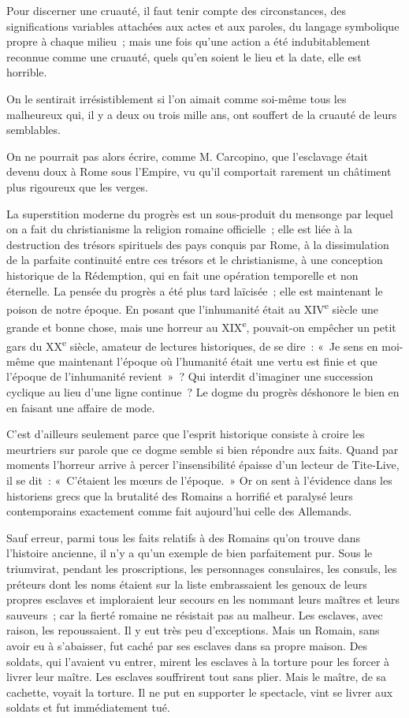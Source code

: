 \documentclass[french,twoside]{book} %
\begin{document}
Pour discerner une cruauté, il faut tenir compte des circonstances, des significations variables attachées aux actes et aux paroles, du langage symbolique propre à chaque milieu ; mais une fois qu'une action a été indubitablement reconnue comme une cruauté, quels qu'en soient le lieu et la date, elle est horrible.\par
On le sentirait irrésistiblement si l'on aimait comme soi-même tous les malheureux qui, il y a deux ou trois mille ans, ont souffert de la cruauté de leurs semblables.\par
On ne pourrait pas alors écrire, comme M. Carcopino, que l'esclavage était devenu doux à Rome sous l'Empire, vu qu'il comportait rarement un châtiment plus rigoureux que les verges.\par
La superstition moderne du progrès est un sous-produit du mensonge par lequel on a fait du christianisme la religion romaine officielle ; elle est liée à la destruction des trésors spirituels des pays conquis par Rome, à la dissimulation de la parfaite continuité entre ces trésors et le christianisme, à une conception historique de la Rédemption, qui en fait une opération temporelle et non éternelle. La pensée du progrès a été plus tard laïcisée ; elle est maintenant le poison de notre époque. En posant que l'inhumanité était au XIV\textsuperscript{e} siècle une grande et bonne chose, mais une horreur au XIX\textsuperscript{e}, pouvait-on empêcher un petit gars du XX\textsuperscript{e} siècle, amateur de lectures historiques, de se dire : « Je sens en moi-même que maintenant l'époque où l'humanité était une vertu est finie et que l'époque de l'inhumanité revient » ? Qui interdit d'imaginer une succession cyclique au lieu d'une ligne continue ? Le dogme du progrès déshonore le bien en en faisant une affaire de mode.\par
C'est d'ailleurs seulement parce que l'esprit historique consiste à croire les meurtriers sur parole que ce dogme semble si bien répondre aux faits. Quand par moments l'horreur arrive à percer l'insensibilité épaisse d'un lecteur de Tite-Live, il se dit : « C'étaient les mœurs de l'époque. » Or on sent à l'évidence dans les historiens grecs que la brutalité des Romains a horrifié et paralysé leurs contemporains exactement comme fait aujourd'hui celle des Allemands.\par
Sauf erreur, parmi tous les faits relatifs à des Romains qu'on trouve dans l'histoire ancienne, il n'y a qu'un exemple de bien parfaitement pur. Sous le triumvirat, pendant les proscriptions, les personnages consulaires, les consuls, les préteurs dont les noms étaient sur la liste embrassaient les genoux de leurs propres esclaves et imploraient leur secours en les nommant leurs maîtres et leurs sauveurs ; car la fierté romaine ne résistait pas au malheur. Les esclaves, avec raison, les repoussaient. Il y eut très peu d'exceptions. Mais un Romain, sans avoir eu à s'abaisser, fut caché par ses esclaves dans sa propre maison. Des soldats, qui l'avaient vu entrer, mirent les esclaves à la torture pour les forcer à livrer leur maître. Les esclaves souffrirent tout sans plier. Mais le maître, de sa cachette, voyait la torture. Il ne put en supporter le spectacle, vint se livrer aux soldats et fut immédiatement tué.\par
\end{document}
